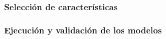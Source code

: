 



\subsubsection{Selección de características}





\subsubsection{Ejecución y validación de los modelos}